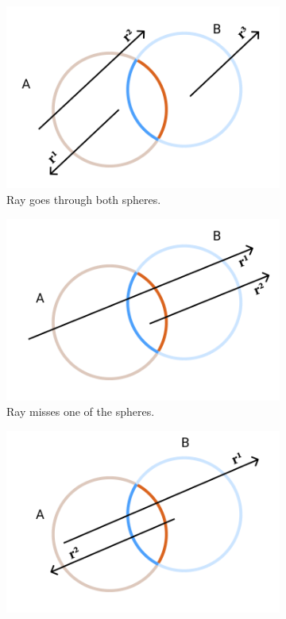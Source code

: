 \documentclass[a4paper,11pt,oneside]{article}
\begin{document}
\begin{figure}[ht]
	\centering
	\begin{subfigure}[b]{0.3\textwidth}
		\centering
		\includegraphics[width=\textwidth]{section4/4.1/intersection-case-1.png}
		\caption{Ray goes through both spheres.}
		\label{sec3.4:intersection-case-1}
	\end{subfigure}
	\hfill
	\begin{subfigure}[b]{0.3\textwidth}
		\centering
		\includegraphics[width=\textwidth]{section4/4.1/intersection-case-2.png}
		\caption{Ray misses one of the spheres.}
		\label{sec3.4:intersection-case-2}
	\end{subfigure}
	\hfill
	\begin{subfigure}[b]{0.3\textwidth}
		\centering
		\includegraphics[width=\textwidth]{section4/4.1/intersection-case-3.png}

\end{subfigure}
\end{figure}
\end{document}

